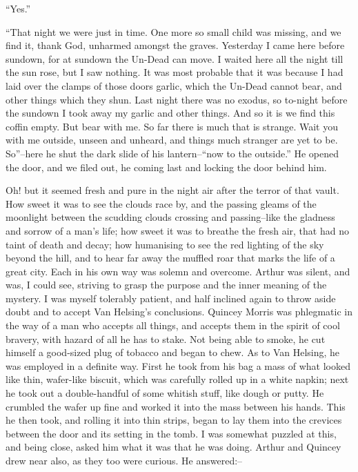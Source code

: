 \documentclass[12pt,openright]{book}
\begin{document}
“Yes.”

“That night we were just in time. One more so small child was missing, and we find it, thank God, unharmed amongst the graves. Yesterday I came here before sundown, for at sundown the Un-Dead can move. I waited here all the night till the sun rose, but I saw nothing. It was most probable that it was because I had laid over the clamps of those doors garlic, which the Un-Dead cannot bear, and other things which they shun. Last night there was no exodus, so to-night before the sundown I took away my garlic and other things. And so it is we find this coffin empty. But bear with me. So far there is much that is strange. Wait you with me outside, unseen and unheard, and things much stranger are yet to be. So”–here he shut the dark slide of his lantern–“now to the outside.” He opened the door, and we filed out, he coming last and locking the door behind him.

Oh! but it seemed fresh and pure in the night air after the terror of that vault. How sweet it was to see the clouds race by, and the passing gleams of the moonlight between the scudding clouds crossing and passing–like the gladness and sorrow of a man’s life; how sweet it was to breathe the fresh air, that had no taint of death and decay; how humanising to see the red lighting of the sky beyond the hill, and to hear far away the muffled roar that marks the life of a great city. Each in his own way was solemn and overcome. Arthur was silent, and was, I could see, striving to grasp the purpose and the inner meaning of the mystery. I was myself tolerably patient, and half inclined again to throw aside doubt and to accept Van Helsing’s conclusions. Quincey Morris was phlegmatic in the way of a man who accepts all things, and accepts them in the spirit of cool bravery, with hazard of all he has to stake. Not being able to smoke, he cut himself a good-sized plug of tobacco and began to chew. As to Van Helsing, he was employed in a definite way. First he took from his bag a mass of what looked like thin, wafer-like biscuit, which was carefully rolled up in a white napkin; next he took out a double-handful of some whitish stuff, like dough or putty. He crumbled the wafer up fine and worked it into the mass between his hands. This he then took, and rolling it into thin strips, began to lay them into the crevices between the door and its setting in the tomb. I was somewhat puzzled at this, and being close, asked him what it was that he was doing. Arthur and Quincey drew near also, as they too were curious. He answered:–
\end{document}
